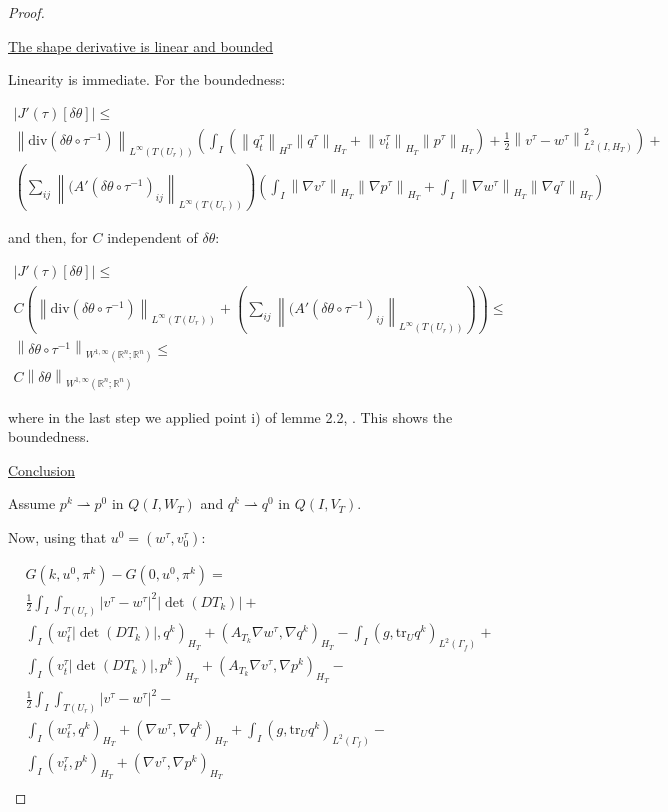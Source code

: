 \documentclass[english,a4paper,12pt,oneside]{scrbook}
\theoremstyle{break}
\newenvironment{mproof}[1][\proofname]{%
  \begin{proof}[#1]$ $\par\nobreak\ignorespaces
}{%
  \end{proof}
}
\renewcommand*{\proofname}{Proof}
\theoremstyle{remark}
\newcommand{\mR}{\mathbb{R}}
\newcommand{\norm}[1]{\left\lVert#1\right\rVert}
\newcommand{\tr}{\text{tr}}
\newcommand{\te}{\theta}
\newcommand{\dive}{\text{div}}
\newcommand{\weakc}{\rightharpoonup}
\begin{document}
\begin{mproof}

\underline{The shape derivative is linear and bounded}

Linearity is immediate. For the boundedness:

\begin{align*}
|J'(\tau)[\delta \te]| \leq\\ \norm{\dive(\delta \te\circ  \tau^{-1})}_{L^\infty(T(U_r))}\left (\int_I( \norm{q_t^\tau}_{H^T}\norm{q^\tau}_{H_T}+ \norm{v_t^\tau}_{H_T}\norm{p^\tau}_{H_T})+\frac{1}{2}\norm{v^\tau-w^\tau}^2_{L^2(I,H_T)}\right )+\\
\left(\sum_{ij} \norm{(A'(\delta\te \circ \tau^{-1})_{ij}}_{L^\infty(T(U_r))}\right )\left (
\int_I \norm{\nabla v^\tau}_{H_T} \norm{\nabla p^\tau}_{H_T}+ \int_I \norm{\nabla w^\tau}_{H_T} \norm{\nabla q^\tau}_{H_T}\right )
\end{align*}

and then, for $C$ independent of $\delta \te$:

\begin{align*}
|J'(\tau)[\delta \te]| \leq\\ C \left ( \norm{\dive(\delta \te\circ  \tau^{-1})}_{L^\infty(T(U_r))}+\left(\sum_{ij} \norm{(A'(\delta\te \circ \tau^{-1})_{ij}}_{L^\infty(T(U_r))}\right )\right )\leq\\
\norm{\delta \te \circ \tau^{-1}}_{W^{1,\infty}(\mR^n;\mR^n)}\leq \\
C\norm{\delta \te }_{W^{1,\infty}(\mR^n;\mR^n)}
\end{align*}

where in the last step we applied point i) of lemme 2.2, \cite{murat}. This shows the boundedness.

\underline{Conclusion}

Assume $p^k \weakc p^0$ in $Q(I,W_T)$ and $q^k \weakc q^0$ in $Q(I,V_T)$.

Now, using that $u^0=(w^\tau, v_0^\tau)$:

\begin{align*}
G(k,u^0,\pi^k)-G(0,u^0,\pi^k) =\\
\frac{1}{2}\int_I \int_{T(U_r)}|v^\tau-w^\tau|^2|\det(DT_k)|+\\
\int_I ( w_t^\tau |\det(DT_k)| , q^k)_{H_T}+ (A_{T_k}\nabla w^\tau, \nabla q^k)_{H_T} -\int_I(g,\tr_{U} q^k)_{L^2(\Gamma_f)} +\\ \int_I (v_t^\tau |\det(DT_k)|,p^k )_{H_T} + (A_{T_k} \nabla v^\tau, \nabla p^k)_{H_T} - \\
\frac{1}{2}\int_I \int_{T(U_r)}|v^\tau-w^\tau|^2-\\
\int_I ( w_t^\tau , q^k )_{H_T}+(\nabla w^\tau, \nabla q^k)_{H_T} +\int_I(g,\tr_{U} q^k)_{L^2(\Gamma_f)} -\\ \int_I (v_t^\tau,p^k )_{H_T} + ( \nabla v^\tau, \nabla p^k)_{H_T} \\
\end{align*}


\end{mproof}
\end{document}
